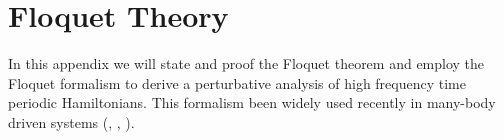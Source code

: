 \chapter{Floquet Theory}
\label{APE}
In this appendix we will state and proof the Floquet theorem and employ the Floquet formalism to derive a perturbative analysis of high frequency time periodic Hamiltonians. This formalism been widely used recently in many-body driven systems (\cite{Desbuquois2017}, \cite{Bordia2017}, \cite{Gorg2018}).